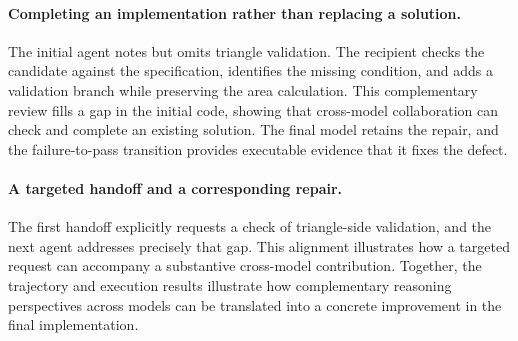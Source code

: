 \begingroup
\setlength{\fboxsep}{7pt}
\endgroup

\paragraph{Completing an implementation rather than replacing a solution.}
The initial agent notes but omits triangle validation. The recipient checks the candidate against the specification, identifies the missing condition, and adds a validation branch while preserving the area calculation. This complementary review fills a gap in the initial code, showing that cross-model collaboration can check and complete an existing solution. The final model retains the repair, and the failure-to-pass transition provides executable evidence that it fixes the defect.

\paragraph{A targeted handoff and a corresponding repair.}
The first handoff explicitly requests a check of triangle-side validation, and the next agent addresses precisely that gap. This alignment illustrates how a targeted request can accompany a substantive cross-model contribution. Together, the trajectory and execution results illustrate how complementary reasoning perspectives across models can be translated into a concrete improvement in the final implementation.

\FloatBarrier
